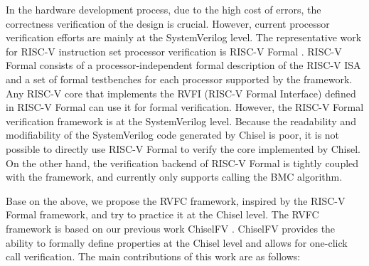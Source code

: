 \documentclass[conference]{IEEEtran}
\theoremstyle{definition}
\begin{document}
In the hardware development process, due to the high cost of errors, the correctness verification of the design is crucial.
However, current processor verification efforts are mainly at the SystemVerilog level.
The representative work for RISC-V instruction set processor verification is RISC-V Formal \cite{riscvFvChisel}.
RISC-V Formal consists of a processor-independent formal description of the RISC-V ISA and a set of formal testbenches for each processor supported by the framework.
Any RISC-V core that implements the RVFI (RISC-V Formal Interface) defined in RISC-V Formal can use it for formal verification.
However, the RISC-V Formal verification framework is at the SystemVerilog level.
Because the readability and modifiability of the SystemVerilog code generated by Chisel is poor, it is not possible to directly use RISC-V Formal to verify the core implemented by Chisel.
On the other hand, the verification backend of RISC-V Formal is tightly coupled with the framework, and currently only supports calling the BMC algorithm.

Base on the above, we propose the RVFC framework, inspired by the RISC-V Formal framework, and try to practice it at the Chisel level. 
The RVFC framework is based on our previous work ChiselFV \cite{ChiselFV}.
ChiselFV provides the ability to formally define properties at the Chisel level and allows for one-click call verification.
The main contributions of this work are as follows:
\end{document}
